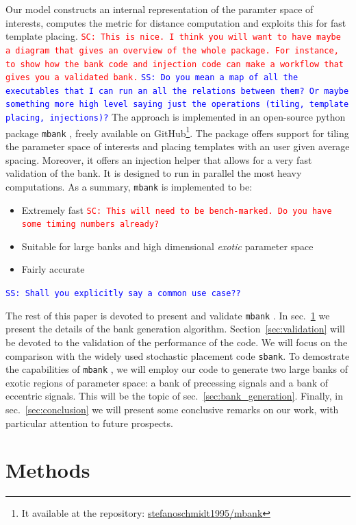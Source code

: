 \documentclass[twocolumn,showpacs,preprintnumbers,nofootinbib,prd,
superscriptaddress,10pt]{revtex4-2}
\newcommand{\mbank}{\texttt{mbank} }
\newcommand{\stefano}[1]{{\textcolor{blue}{\texttt{SS: #1}} }}
\newcommand{\sarah}[1]{{\textcolor{red}{\texttt{SC: #1}} }}
\begin{document}
Our model constructs an internal representation of the paramter space of interests, computes the metric for distance computation and exploits this for fast template placing. \sarah{This is nice. I think you will want to have maybe a diagram that gives an overview of the whole package. For instance, to show how the bank code and injection code can make a workflow that gives you a validated bank.} \stefano{Do you mean a map of all the executables that I can run an all the relations between them? Or maybe something more high level saying just the operations (tiling, template placing, injections)?}
The approach is implemented in an open-source python package \mbank, freely available on GitHub\footnote{
It available at the repository: \href{https://github.com/stefanoschmidt1995/mbank}{stefanoschmidt1995/mbank}}.
The package offers support for tiling the parameter space of interests and placing templates with an user given average spacing. Moreover, it offers an injection helper that allows for a very fast validation of the bank.
It is designed to run in parallel the most heavy computations.
As a summary, \mbank is implemented to be:
\begin{itemize}
	\item Extremely fast \sarah{This will need to be bench-marked. Do you have some timing numbers already?}
	\item Suitable for large banks and high dimensional {\it exotic} parameter space
	\item Fairly accurate
\end{itemize}
\stefano{Shall you explicitly say a common use case??}

The rest of this paper is devoted to present and validate \mbank.
In sec.~\ref{sec:methods} we present the details of the bank generation algorithm.
Section~\ref{sec:validation} will be devoted to the validation of the performance of the code. We will focus on the comparison with the widely used stochastic placement code \texttt{sbank}.
To demostrate the capabilities of \mbank, we will employ our code to generate two large banks of exotic regions of parameter space: a bank of precessing signals and a bank of eccentric signals. This will be the topic of sec.~\ref{sec:bank_generation}.
Finally, in sec.~\ref{sec:conclusion} we will present some conclusive remarks on our work, with particular attention to future prospects.

\section{Methods} \label{sec:methods}
\end{document}
